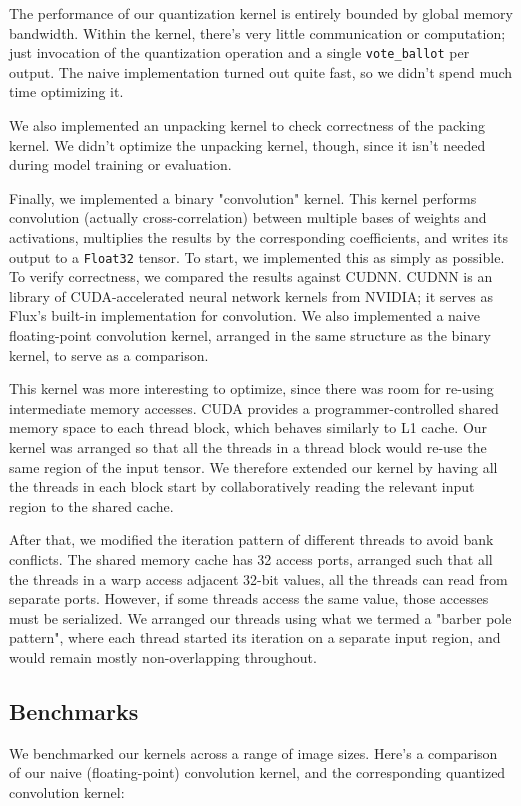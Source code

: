 \documentclass[12pt]{article}
\begin{document}
The performance of our quantization kernel is entirely bounded by global memory bandwidth. Within the kernel, there's very little communication or computation; just invocation of the quantization operation and a single \texttt{vote\_ballot} per output. The naive implementation turned out quite fast, so we didn't spend much time optimizing it.

We also implemented an unpacking kernel to check correctness of the packing kernel. We didn't optimize the unpacking kernel, though, since it isn't needed during model training or evaluation.

Finally, we implemented a binary "convolution" kernel. This kernel performs convolution (actually cross-correlation) between multiple bases of weights and activations, multiplies the results by the corresponding coefficients, and writes its output to a \texttt{Float32} tensor. To start, we implemented this as simply as possible. To verify correctness, we compared the results against CUDNN. CUDNN is an library of CUDA-accelerated neural network kernels from NVIDIA; it serves as Flux's built-in implementation for convolution. We also implemented a naive floating-point convolution kernel, arranged in the same structure as the binary kernel, to serve as a comparison.

This kernel was more interesting to optimize, since there was room for re-using intermediate memory accesses. CUDA provides a programmer-controlled shared memory space to each thread block, which behaves similarly to L1 cache. Our kernel was arranged so that all the threads in a thread block would re-use the same region of the input tensor. We therefore extended our kernel by having all the threads in each block start by collaboratively reading the relevant input region to the shared cache.

After that, we modified the iteration pattern of different threads to avoid bank conflicts. The shared memory cache has 32 access ports, arranged such that all the threads in a warp access adjacent 32-bit values, all the threads can read from separate ports. However, if some threads access the same value, those accesses must be serialized. We arranged our threads using what we termed a "barber pole pattern", where each thread started its iteration on a separate input region, and would remain mostly non-overlapping throughout.

\subsection{Benchmarks}
\label{sec:orgf142f29}
We benchmarked our kernels across a range of image sizes. Here's a comparison of our naive (floating-point) convolution kernel, and the corresponding quantized convolution kernel:
\end{document}

